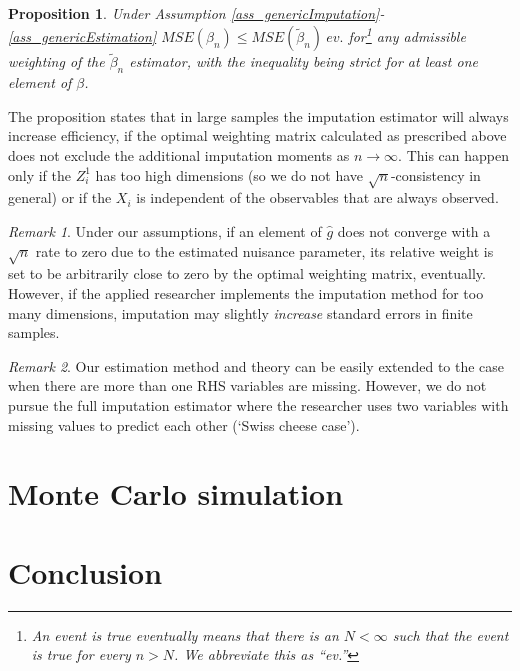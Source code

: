 \documentclass{article}
\newtheorem{proposition}{Proposition}
\theoremstyle{definition}
\theoremstyle{remark}
\newtheorem{remark}{Remark}
\begin{document}
\begin{proposition}
	Under Assumption \ref{ass_genericImputation}-\ref{ass_genericEstimation} $MSE(\beta_n)\leq MSE(\tilde{\beta}_n) \ ev.$ for\footnote{An event is true eventually means that there is an $N<\infty$ such that the event is true for every $n>N$. We abbreviate this as ``ev.''} any admissible weighting of the $\tilde{\beta}_n$ estimator, with the inequality being strict for at least one element of $\beta$.
\end{proposition}
The proposition states that in large samples the imputation estimator will always increase efficiency, if the optimal weighting matrix calculated as prescribed above does not exclude the additional imputation moments as $n\rightarrow \infty$. This can happen only if the $Z_i^1$ has too high dimensions (so we do not have $\sqrt{n}$-consistency in general) or if the $X_i$ is independent of the observables that are always observed.

\begin{remark}
	Under our assumptions, if an element of $\hat{g}$ does not converge with a $\sqrt{n}$ rate to zero due to the estimated nuisance parameter, its relative weight is set to be arbitrarily close to zero by the optimal weighting matrix, eventually. However, if the applied researcher implements the imputation method for too many dimensions, imputation may slightly \textit{increase} standard errors in finite samples. 
\end{remark}

\begin{remark}
	Our estimation method and theory can be easily extended to the case when there are more than one RHS variables are missing. However, we do not pursue the full imputation estimator where the researcher uses two variables with missing values to predict each other (`Swiss cheese case').
\end{remark}

\section{Monte Carlo simulation}




\section{Conclusion}
\end{document}
